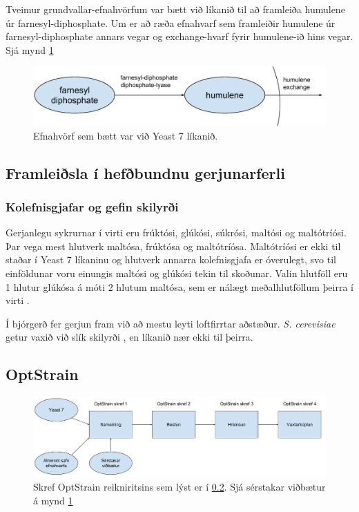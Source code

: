 \documentclass[12pt]{article}
\begin{document}
Tveimur grundvallar-efnahvörfum var bætt við líkanið til að framleiða humulene úr farnesyl-diphosphate.
Um er að ræða efnahvarf sem framleiðir humulene úr farnesyl-diphosphate annars vegar og exchange-hvarf fyrir humulene-ið hins vegar. Sjá mynd \ref{fig:pathway}

\begin{figure}
\caption[Viðbætur við Yeast 7]{Efnahvörf sem bætt var við Yeast 7 líkanið.}
\label{fig:pathway}
\includegraphics[width=\textwidth]{Pics/HumuleneAddition}
\end{figure}
\subsection{Framleiðsla í hefðbundnu gerjunarferli}
\label{sec:hefdbundid}
\subsubsection{Kolefnisgjafar og gefin skilyrði}
Gerjanlegu sykrurnar í virti eru frúktósi, glúkósi, súkrósi, maltósi og maltótríósi. Þar vega mest hlutverk maltósa, frúktósa og maltótríósa. Maltótríósi er ekki til staðar í Yeast 7 líkaninu og hlutverk annarra kolefnisgjafa er óverulegt, svo til einföldunar voru einungis maltósi og glúkósi tekin til skoðunar. Valin hlutföll eru 1 hlutur glúkósa á móti 2 hlutum maltósa, sem er nálægt meðalhlutföllum þeirra í virti \cite{otter1967determination}. 

Í bjórgerð fer gerjun fram við að mestu leyti loftfirrtar aðstæður. \emph{S. cerevisiae} getur vaxið við slík skilyrði \cite{ishtar2007factors}, en líkanið nær ekki til þeirra.
\subsection{OptStrain}
\label{sec:optstrain}
\begin{figure}
\caption[OptStrain reikniritið]{Skref OptStrain reikniritsins sem lýst er í \ref{sec:optstrain}. Sjá sérstakar viðbætur á mynd \ref{fig:pathway}}
\label{fig:flaedirit}
\includegraphics[width=\textwidth]{Pics/OptStrainOverview}
\end{figure}
\end{document}

